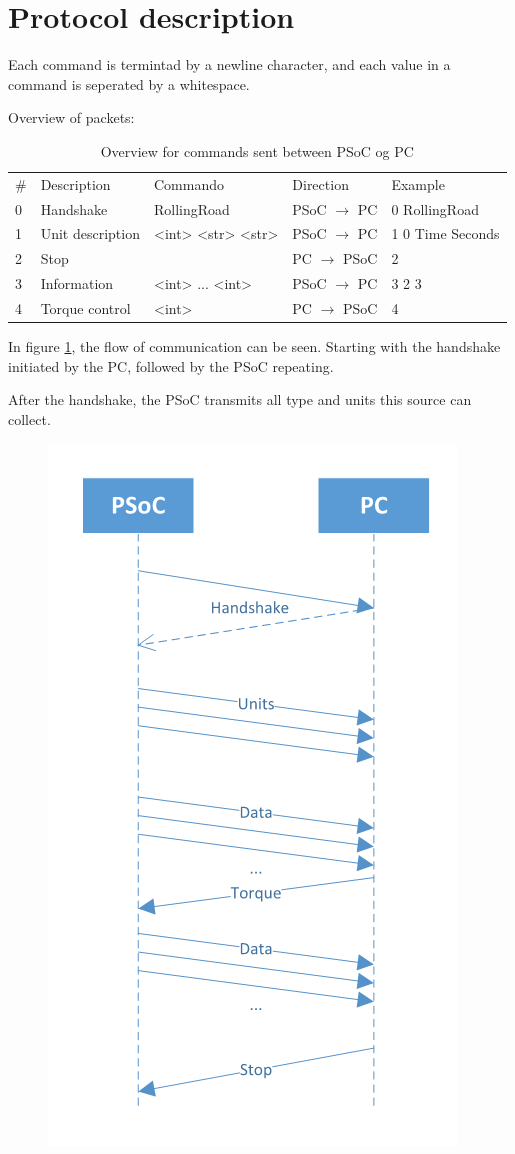 \section{Protocol description}

Each command is termintad by a newline character, and each value in a command is seperated by a whitespace.

Overview of packets:
\begin{table}[h!]
	\centering
	\label{Protocol:overview}
	\begin{tabular}{lllll}
		\# & Description 		& Commando    		& Direction             & Example     		\\
		0  & Handshake   		& RollingRoad 		& PSoC $\rightarrow$ PC & 0 RollingRoad 	\\
		1  & Unit description 	& <int> <str> <str> & PSoC $\rightarrow$ PC & 1 0 Time Seconds 	\\
		2  & Stop        		&            		& PC $\rightarrow$ PSoC	& 2        			\\
		3  & Information 		& <int> ... <int>	& PSoC $\rightarrow$ PC & 3 2 3 	    	\\
		4  & Torque control 	& <int>    			& PC $\rightarrow$ PSoC & 4    				\\
	\end{tabular}
	\caption{Overview for commands sent between PSoC og PC}
\end{table}

In figure \ref{fig:TimingDiagram}, the flow of communication can be seen. Starting with the handshake initiated by the PC, followed by the PSoC repeating.

After the handshake, the PSoC transmits all type and units this source can collect.

\begin{figure}
\centering
\includegraphics[width=0.5\linewidth]{Protocol/TimingDiagram}
\caption{}
\label{fig:TimingDiagram}
\end{figure}


